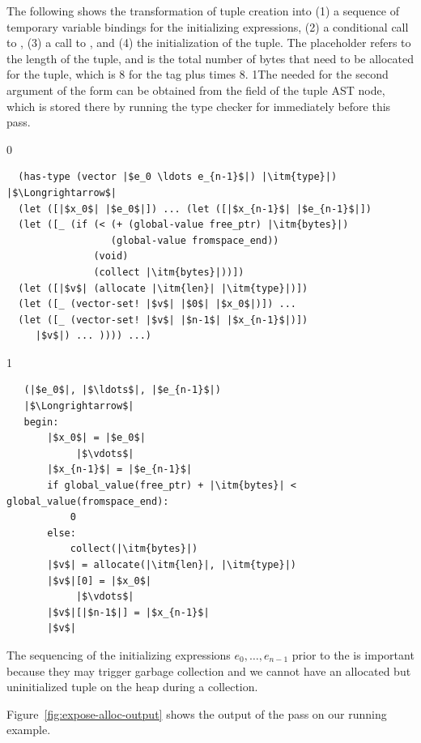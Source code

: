 \documentclass[7x10]{TimesAPriori_MIT}%
\def\racketEd{0}
\def\pythonEd{1}
\providecommand{\BookEdition}{1}
\let\edition\BookEdition
\newcommand{\pythonColor}[0]{}
\newcommand{\python}[1]{{\if\edition\pythonEd\pythonColor #1\fi}}
\numberwithin{theorem}{chapter}
\numberwithin{definition}{chapter}
\numberwithin{equation}{chapter}
\begin{document}
The following shows the transformation of tuple creation into (1) a
sequence of temporary variable bindings for the initializing
expressions, (2) a conditional call to , (3) a call to
, and (4) the initialization of the tuple. The
 placeholder refers to the length of the tuple, and
 is the total number of bytes that need to be allocated for
the tuple, which is 8 for the tag plus  times 8.
%
\python{The  needed for the second argument of the
  \code{allocate} form can be obtained from the \code{has\_type} field
  of the tuple AST node, which is stored there by running the type
  checker for \LangVec{} immediately before this pass.}
%
\begin{center}
\begin{minipage}{\textwidth}
{\if\edition\racketEd
\begin{lstlisting}
  (has-type (vector |$e_0 \ldots e_{n-1}$|) |\itm{type}|)
|$\Longrightarrow$|
  (let ([|$x_0$| |$e_0$|]) ... (let ([|$x_{n-1}$| |$e_{n-1}$|])
  (let ([_ (if (< (+ (global-value free_ptr) |\itm{bytes}|)
                  (global-value fromspace_end))
               (void)
               (collect |\itm{bytes}|))])
  (let ([|$v$| (allocate |\itm{len}| |\itm{type}|)])
  (let ([_ (vector-set! |$v$| |$0$| |$x_0$|)]) ...
  (let ([_ (vector-set! |$v$| |$n-1$| |$x_{n-1}$|)])
     |$v$|) ... )))) ...)
\end{lstlisting}
\fi}
{\if\edition\pythonEd\pythonColor
\begin{lstlisting}
   (|$e_0$|, |$\ldots$|, |$e_{n-1}$|)
   |$\Longrightarrow$|
   begin:
       |$x_0$| = |$e_0$|
            |$\vdots$|
       |$x_{n-1}$| = |$e_{n-1}$|
       if global_value(free_ptr) + |\itm{bytes}| < global_value(fromspace_end):
           0
       else:
           collect(|\itm{bytes}|)
       |$v$| = allocate(|\itm{len}|, |\itm{type}|)
       |$v$|[0] = |$x_0$|
            |$\vdots$|
       |$v$|[|$n-1$|] = |$x_{n-1}$|
       |$v$|
\end{lstlisting}
\fi}
\end{minipage}
\end{center}
%
\noindent The sequencing of the initializing expressions
$e_0,\ldots,e_{n-1}$ prior to the  is important because
they may trigger garbage collection and we cannot have an allocated
but uninitialized tuple on the heap during a collection.

Figure~\ref{fig:expose-alloc-output} shows the output of the
 pass on our running example.
\end{document}
